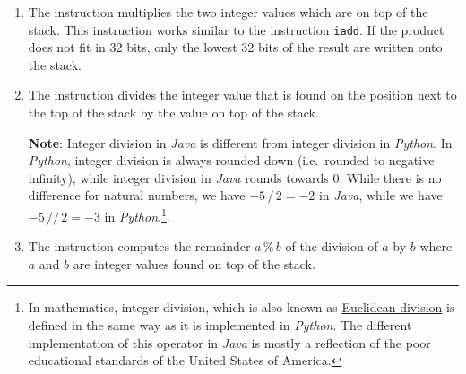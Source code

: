 \begin{enumerate}
\setlength{\unitlength}{0.5cm}
\begin{figure}[!ht]
  \centering
{}
  \caption{The effect of \texttt{isub}.}
  \label{fig:ijvm-sub}
\end{figure}

\item The instruction 
      multiplies the two integer values which are on top of the stack.  This instruction works similar to
      the instruction \texttt{iadd}.  If the product does not fit in 32 bits, only the lowest 32 bits of
      the result are written onto the stack. 
\item The instruction 
      divides the integer value that is found on the position next to the  top of the stack by the value
      on top of the stack.

      \textbf{Note}: Integer division in \textsl{Java} is different from integer division in \textsl{Python}.
      In \textsl{Python}, integer division is always rounded down (i.e.~rounded to negative infinity), while
      integer division in \textsl{Java} rounds towards $0$.  While there is no difference for natural numbers,
      we have $-5 \,\mathtt{/}\, 2 = -2$ in \textsl{Java}, while we have $-5 \,\mathtt{//}\, 2 = -3$ in
      \textsl{Python}.\footnote{
        In mathematics, integer division, which is also known as
        \href{https://en.wikipedia.org/wiki/Euclidean_division}{Euclidean division} is defined in the same way
        as it is implemented in \textsl{Python}.  The different implementation of this operator in
        \textsl{Java} is mostly a reflection of the poor educational standards of the United States of America.
      }. 
\item The instruction 
      computes the remainder $a \,\texttt{\%}\, b$ of the division of $a$ by $b$ where $a$ and $b$ are
      integer values found on top of the stack.


\end{enumerate}
